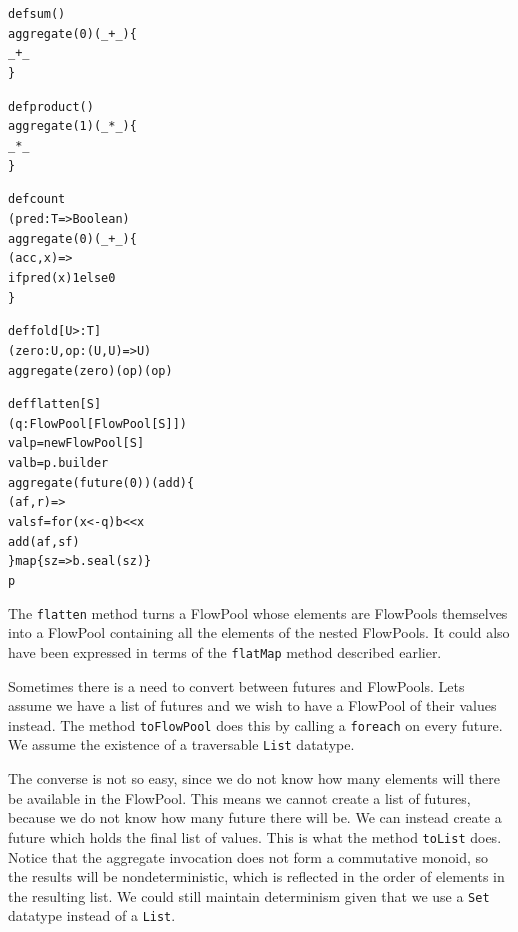 \documentclass[runningheads,a4paper]{llncs}
\begin{document}
\noindent
\begin{minipage}[b]{3.9 cm}
\begin{alltt}
{\scriptsize
def sum()
  aggregate(0)(_ + _) \{
    _ + _
  \}


def product()
  aggregate(1)(_ * _) \{
    _ * _
  \}

}
\end{alltt}
\end{minipage}
\begin{minipage}[b]{3.9 cm}
\begin{alltt}
{\scriptsize
def count
  (pred: T => Boolean)
  aggregate(0)(_ + _) \{
    (acc, x) =>
    if pred(x) 1 else 0
  \}


def fold[U >: T]
  (zero: U, op: (U, U) => U)
  aggregate(zero)(op)(op)
}
\end{alltt}
\end{minipage}
\begin{minipage}[b]{4.7 cm}
\begin{alltt}
{\scriptsize
def flatten[S]
  (q: FlowPool[FlowPool[S]])
  val p = new FlowPool[S]
  val b = p.builder
  aggregate(future(0))(add) \{
    (af, r) =>
    val sf = for (x <- q) b << x
    add(af, sf)
  \} map \{ sz => b.seal(sz) \}
  p

}
\end{alltt}
\end{minipage}

The \verb=flatten= method turns a FlowPool whose elements
are FlowPools themselves into a FlowPool containing all the
elements of the nested FlowPools.
It could also have been expressed in terms
of the \verb=flatMap= method described earlier.

Sometimes there is a need to convert between futures
and FlowPools.
Lets assume we have a list of futures and we wish to
have a FlowPool of their values instead.
The method \verb=toFlowPool= does this by calling a
\verb=foreach= on every future.
We assume the existence of a traversable \verb=List=
datatype.

The converse is not so easy, since we do not know how
many elements will there be available in the FlowPool.
This means we cannot create a list of futures, because
we do not know how many future there will be.
We can instead create a future which holds the final
list of values.
This is what the method \verb=toList= does. 
Notice that the aggregate invocation does not form a
commutative monoid, so the results will be nondeterministic,
which is reflected in the order of elements in the
resulting list.
We could still maintain determinism given that we use
a \verb=Set= datatype instead of a \verb=List=.
\end{document}
